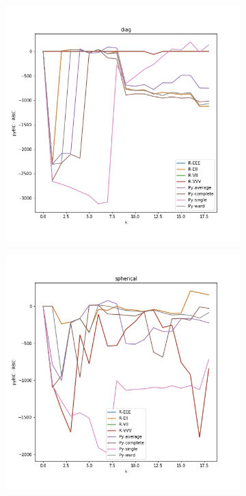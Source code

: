 \documentclass{article}
\begin{document}
\begin{figure}[h!]
\begin{subfigure}[b]{0.45\linewidth}
  \includegraphics[width=\linewidth]{diag.jpg}
\end{subfigure}
\begin{subfigure}[b]{0.45\linewidth}
  \includegraphics[width=\linewidth]{spherical.jpg}
\end{subfigure} 
\end{figure}
\end{document}
